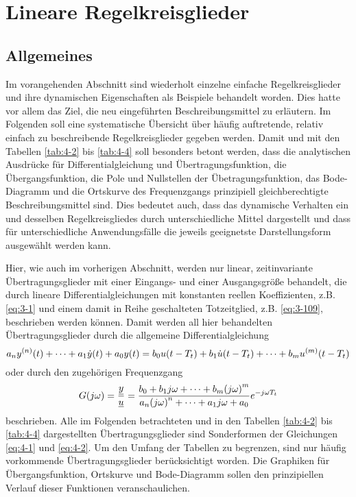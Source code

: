 \section{Lineare Regelkreisglieder}


\subsection{Allgemeines}

Im vorangehenden Abschnitt sind wiederholt einzelne einfache Regelkreisglieder und ihre dynamischen Eigenschaften als Beispiele behandelt worden.
Dies hatte vor allem das Ziel, die neu eingeführten Beschreibungsmittel zu erläutern.
Im Folgenden soll eine systematische Übersicht über häufig auftretende, relativ einfach zu beschreibende Regelkreisglieder gegeben werden.
Damit und mit den Tabellen \ref{tab:4-2} bis \ref{tab:4-4} soll besonders betont werden, dass die analytischen Ausdrücke für Differentialgleichung und Übertragungsfunktion, die Übergangsfunktion, die Pole und Nullstellen der Übetragungsfunktion, das Bode-Diagramm und die Ortskurve des Frequenzgangs prinzipiell gleichberechtigte Beschreibungsmittel sind.
Dies bedeutet auch, dass das dynamische Verhalten ein und desselben Regelkreisgliedes durch unterschiedliche Mittel dargestellt und dass für unterschiedliche Anwendungsfälle die jeweils geeignetste Darstellungsform ausgewählt werden kann.

Hier, wie auch im vorherigen Abschnitt, werden nur linear, zeitinvariante Übertragungsglieder mit einer Eingangs- und einer Ausgangsgröße behandelt, die durch lineare Differentialgleichungen mit konstanten reellen Koeffizienten, z.B. \eqref{eq:3-1} und einem damit in Reihe geschalteten Totzeitglied, z.B. \eqref{eq:3-109}, beschrieben werden können.
Damit werden all hier behandelten Übertragungsglieder durch die allgemeine Differentialgleichung
\begin{equation}\label{eq:4-1}
	a_n y^{\parentheses*{n}}\parentheses*{t} + \cdots + a_1 \dot{y}\parentheses*{t} + a_0 y\parentheses*{t} = b_0 u\parentheses*{t - T_t} + b_1 \dot{u}\parentheses*{t - T_t} + \cdots + b_m u^{\parentheses*{m}}\parentheses*{t - T_t}
\end{equation}
oder durch den zugehörigen Frequenzgang
\begin{equation}\label{eq:4-2}
	G\parentheses*{j\omega} = \frac{\underline{y}}{\underline{u}} = \frac{b_0 + b_1 j\omega + \cdots + b_m \parentheses*{j\omega}^m}{a_n \parentheses*{j\omega}^n + \cdots + a_1 j\omega + a_0}e^{-j\omega T_t}
\end{equation}
beschrieben.
Alle im Folgenden betrachteten und in den Tabellen \ref{tab:4-2} bis \ref{tab:4-4} dargestellten Übertragungsglieder sind Sonderformen der Gleichungen \eqref{eq:4-1} und \eqref{eq:4-2}.
Um den Umfang der Tabellen zu begrenzen, sind nur häufig vorkommende Übertragungsglieder berücksichtigt worden.
Die Graphiken für Übergangsfunktion, Ortskurve und Bode-Diagramm sollen den prinzipiellen Verlauf dieser Funktionen veranschaulichen.


